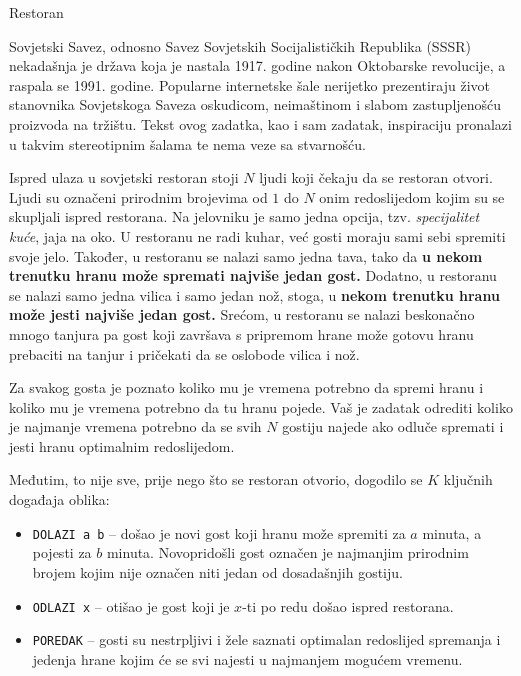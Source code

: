 \begin{statement}[
  problempoints=100,
  timelimit=1 sekunda,
  memorylimit=512 MiB,
]{Restoran}

Sovjetski Savez, odnosno Savez Sovjetskih Socijalističkih Republika (SSSR)
nekadašnja je država koja je nastala 1917. godine nakon Oktobarske revolucije,
a raspala se 1991. godine. Popularne internetske šale nerijetko prezentiraju
život stanovnika Sovjetskoga Saveza oskudicom, neimaštinom i slabom
zastupljenošću proizvoda na tržištu. Tekst ovog zadatka, kao i sam zadatak,
inspiraciju pronalazi u takvim stereotipnim šalama te nema veze sa stvarnošću.

Ispred ulaza u sovjetski restoran stoji $N$ ljudi koji čekaju da se restoran
otvori. Ljudi su označeni prirodnim brojevima od $1$ do $N$ onim redoslijedom
kojim su se skupljali ispred restorana. Na jelovniku je samo jedna opcija,
tzv. \textit{specijalitet kuće}, jaja na oko. U restoranu ne radi kuhar, već
gosti moraju sami sebi spremiti svoje jelo. Također, u restoranu se nalazi
samo jedna tava, tako da \textbf{u nekom trenutku hranu može spremati najviše
jedan gost.} Dodatno, u restoranu se nalazi samo jedna vilica i samo jedan
nož, stoga, u \textbf{nekom trenutku hranu može jesti najviše jedan gost.}
Srećom, u restoranu se nalazi beskonačno mnogo tanjura pa gost koji završava
s pripremom hrane može gotovu hranu prebaciti na tanjur i pričekati da se
oslobode vilica i nož.

Za svakog gosta je poznato koliko mu je vremena potrebno da spremi hranu i
koliko mu je vremena potrebno da tu hranu pojede. Vaš je zadatak odrediti
koliko je najmanje vremena potrebno da se svih $N$ gostiju najede ako odluče
spremati i jesti hranu optimalnim redoslijedom.

Međutim, to nije sve, prije nego što se restoran otvorio, dogodilo se $K$
ključnih događaja oblika:

\begin{itemize}
  \item \texttt{DOLAZI a b} -- došao je novi gost koji hranu može spremiti za
        $a$ minuta, a pojesti za $b$ minuta. Novopridošli gost označen je
        najmanjim prirodnim brojem kojim nije označen niti jedan od dosadašnjih
        gostiju.
  \item \texttt{ODLAZI x} -- otišao je gost koji je $x$-ti po redu došao ispred
        restorana.
  \item \texttt{POREDAK} -- gosti su nestrpljivi i žele saznati optimalan redoslijed
        spremanja i jedenja hrane kojim će se svi najesti u najmanjem mogućem vremenu.
\end{itemize}


\end{statement}

